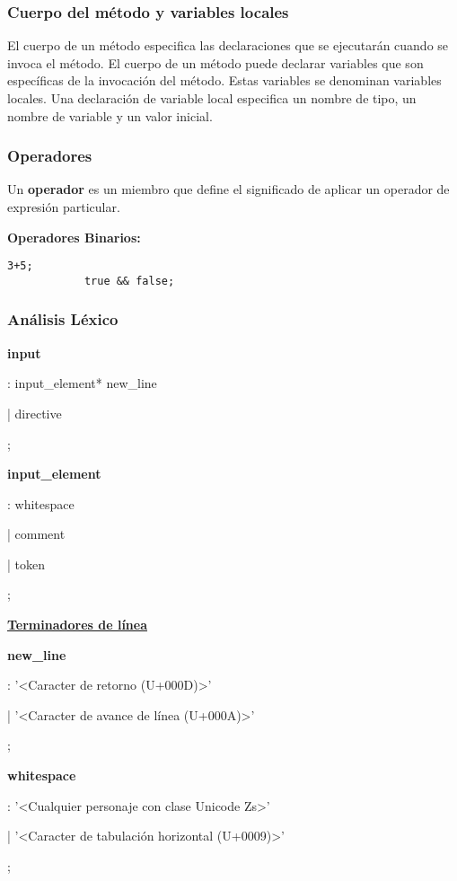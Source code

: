 	\subsubsection{Cuerpo del método y variables locales}
		El cuerpo de un método especifica las declaraciones que se ejecutarán cuando se invoca el método. El cuerpo de un método puede declarar variables que son específicas de la invocación del método. Estas variables se denominan variables locales. Una declaración de variable local especifica un nombre de tipo, un nombre de variable y un valor inicial.
		
	\subsubsection{Operadores}
		Un \textbf{operador} es un miembro que define el significado de aplicar un operador de expresión particular.\par
		
		\textbf{Operadores Binarios:}
		\begin{lstlisting}[language={PSharp}]
			3+5;
			true && false;
		\end{lstlisting}
	
	\subsubsection{Análisis Léxico}
		\textbf{input}\par
		: input\_element* new\_line\par
		| directive\par
		;\par
		
		\textbf{input\_element}\par
		: whitespace\par
		| comment\par
		| token\par
		;\par
		
		\underline{\textbf{Terminadores de línea}}\par
		\textbf{new\_line}\par
		: '<Caracter de retorno (U+000D)>'\par
		| '<Caracter de avance de línea (U+000A)>'\par
		;\par
		
		\textbf{whitespace}\par
		: '<Cualquier personaje con clase Unicode Zs>'\par
		| '<Caracter de tabulación horizontal (U+0009)>'\par
		;\par
		
